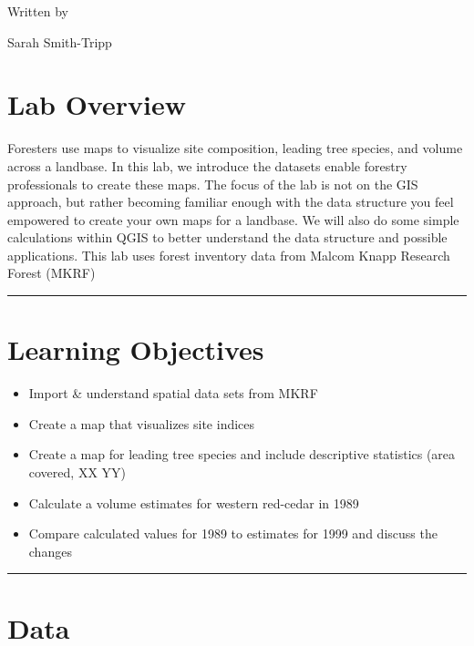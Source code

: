 \documentclass[
  letterpaper,
]{book}
\begin{document}
Written by

Sarah Smith-Tripp

\hypertarget{lab-overview}{%
\section*{Lab Overview}\label{lab-overview}}


Foresters use maps to visualize site composition, leading tree species,
and volume across a landbase. In this lab, we introduce the datasets
enable forestry professionals to create these maps. The focus of the lab
is not on the GIS approach, but rather becoming familiar enough with the
data structure you feel empowered to create your own maps for a
landbase. We will also do some simple calculations within QGIS to better
understand the data structure and possible applications. This lab uses
forest inventory data from Malcom Knapp Research Forest (MKRF)

\begin{center}\rule{0.5\linewidth}{0.5pt}\end{center}

\hypertarget{learning-objectives}{%
\section*{Learning Objectives}\label{learning-objectives}}


\begin{itemize}
\item
  Import \& understand spatial data sets from MKRF
\item
  Create a map that visualizes site indices
\item
  Create a map for leading tree species and include descriptive
  statistics (area covered, XX YY)
\item
  Calculate a volume estimates for western red-cedar in 1989
\item
  Compare calculated values for 1989 to estimates for 1999 and discuss
  the changes
\end{itemize}

\begin{center}\rule{0.5\linewidth}{0.5pt}\end{center}

\hypertarget{data}{%
\section*{Data}\label{data}}
\end{document}
